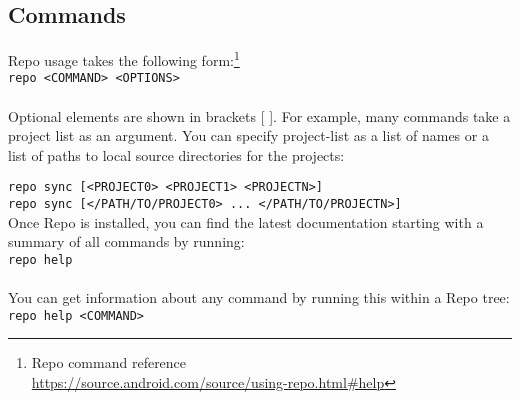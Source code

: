 \documentclass[12pt,letterpaper,dvips]{article}
\newcommand{\cmd}[1]{\texttt{#1}}
\begin{document}
\newpage
\subsection{Commands}
Repo usage takes the following form:\footnote{Repo command reference\\
\href{https://source.android.com/source/using-repo.html\#help}{https://source.android.com/source/using-repo.html\#help}}
\\
\indent \cmd{repo <COMMAND> <OPTIONS>}
\\
\\
Optional elements are shown in brackets [ ].  For example, many commands take
a project list as an argument.  You can specify project-list as a list of
names or a list of paths to local source directories for the projects:

\indent \cmd{repo sync [<PROJECT0> <PROJECT1> <PROJECTN>]}\\
\indent \cmd{repo sync [</PATH/TO/PROJECT0> ... </PATH/TO/PROJECTN>]}
\\

\noindent Once Repo is installed, you can find the latest documentation
starting with a summary of all commands by running:
\\
\indent \cmd{repo help}
\\
\\
\noindent You can get information about any command by running this within a Repo tree:
\\
\indent \cmd{repo help <COMMAND>}
\end{document}

